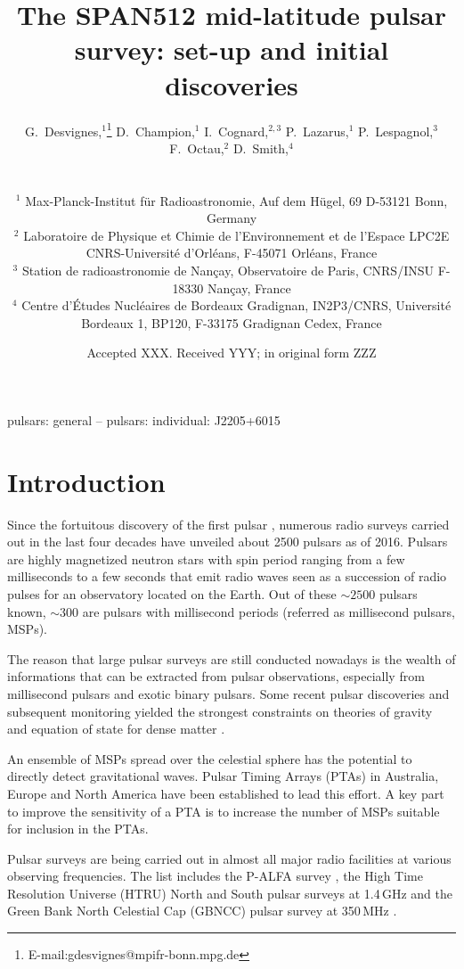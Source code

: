 \documentclass[a4paper,fleqn,usenatbib]{mnras}
\title[SPAN512]{The SPAN512 mid-latitude pulsar survey: set-up and initial discoveries}
\author[G. Desvignes et al.]{\parbox{\textwidth}{G.~Desvignes,$^{1}$\thanks{E-mail:gdesvignes@mpifr-bonn.mpg.de}
 D.~Champion,$^{1}$
 I.~Cognard,$^{2,3}$
 P.~Lazarus,$^{1}$
 P.~Lespagnol,$^{3}$
 F.~Octau,$^{2}$
 D.~Smith,$^{4}$
 }
\vspace{0.4cm} \\ 
\parbox{\textwidth}{
$^{1}$ Max-Planck-Institut f\"ur Radioastronomie, Auf dem H\"ugel, 69 D-53121 Bonn, Germany\\
$^{2}$ Laboratoire de Physique et Chimie de l'Environnement et de l'Espace LPC2E CNRS-Universit{\'e} d'Orl{\'e}ans, F-45071 Orl{\'e}ans, France\\
$^{3}$ Station de radioastronomie de Nan{\c c}ay, Observatoire de Paris, CNRS/INSU F-18330 Nan{\c c}ay, France\\
$^{4}$ Centre d'\'Etudes Nucl\'eaires de Bordeaux Gradignan, IN2P3/CNRS, Universit\'e Bordeaux 1, BP120, F-33175 Gradignan Cedex, France
}
}
\date{Accepted XXX. Received YYY; in original form ZZZ}
\begin{document}
\label{firstpage}
\pagerange{\pageref{firstpage}--\pageref{lastpage}}
\maketitle

\begin{abstract}

\end{abstract}

\begin{keywords}
pulsars: general -- pulsars: individual: J2205+6015
\end{keywords}

\section{Introduction}

Since the fortuitous discovery of the first pulsar \citep{hbp+68},
numerous radio surveys carried out in the last four decades
have unveiled about 2500 pulsars as of 2016.  Pulsars are highly
magnetized neutron stars with spin period ranging from a few
milliseconds to a few seconds that emit radio waves seen as a
succession of radio pulses for an observatory located on the Earth.
Out of these $\sim 2500$ pulsars known, $\sim 300$ are pulsars with millisecond
periods (referred as millisecond pulsars, MSPs).

The reason that large pulsar surveys are still conducted nowadays is
the wealth of informations that can be extracted from pulsar
observations, especially from millisecond pulsars and exotic binary
pulsars.  Some recent pulsar discoveries and subsequent monitoring
yielded the strongest constraints on theories of gravity \cite[PSR
  J0737$-$3039A/B,][]{ksm+06} and equation of state for dense matter
\citep[][]{af}.

An ensemble of MSPs spread over the celestial sphere has the potential
to directly detect gravitational waves. Pulsar Timing Arrays (PTAs) in
Australia, Europe and North America have been established to lead this
effort. A key part to improve the sensitivity of a PTA is to increase
the number of MSPs suitable for inclusion in the PTAs.

Pulsar surveys are being carried out in almost all major radio
facilities at various observing frequencies. The list includes the
P-ALFA survey \citep{cfl+06,lbh+15}, the High Time Resolution Universe
(HTRU) North \citep{bck+13} and South \citep{kjs+10} pulsar surveys at 1.4\,GHz
and the Green Bank North Celestial Cap (GBNCC) pulsar survey at 350\,MHz \citep{slr+14}.
\end{document}

